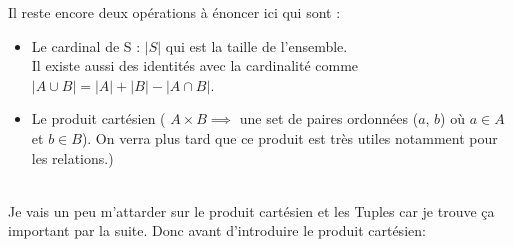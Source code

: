\hspace{0.4cm}
Il reste encore deux opérations à énoncer ici qui sont : 
\begin{itemize}
    \item Le cardinal de S : $|S|$ qui est la taille de l'ensemble.
\\
Il existe aussi des identités avec la cardinalité comme $|A \cup B| =|A| + |B| - |A \cap B|$.
    \item Le produit cartésien ( $A \times B \implies$ une set de paires ordonnées ($a$, $b$) où $a \in A$ et $b \in B$). On verra plus tard que ce produit est très utiles notamment pour les relations.)
\end{itemize}
\\
Je vais un peu m'attarder sur le produit cartésien et les Tuples car je trouve ça important par la suite. Donc avant d'introduire le produit cartésien:

